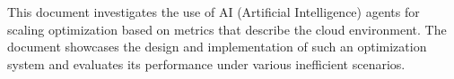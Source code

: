  This document investigates the use of AI (Artificial Intelligence) agents 
 for scaling optimization based on metrics that describe the cloud environment.
 The document showcases the design and implementation of such an optimization system 
 and evaluates its performance under various inefficient scenarios.
    



\vfill
\selectthesislanguage

\setcounter{romanPage}{\value{page}}
